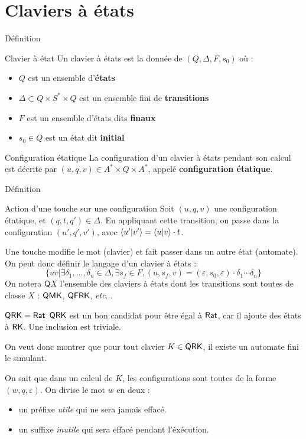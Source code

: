 \documentclass[11pt,french,professionalfonts]{beamer}
\begin{document}
\section{Claviers à états}
\begin{frame}{Définition}
	\begin{block}{Clavier à état}
		Un clavier à états est la donnée de $(Q,\Delta ,F,s_0)$ où :
        \begin{itemize}
            \item $Q$ est un ensemble d'\textbf{états}
            \item $\Delta \subset Q \times S^* \times Q$ est un ensemble fini de \textbf{transitions}
            \item $F$ est un ensemble d'états dits \textbf{finaux}
            \item $s_0 \in Q$ est un état dit \textbf{initial}
        \end{itemize}
	\end{block}
	\pause
	\begin{block}{Configuration étatique}
		La configuration d'un clavier à états pendant son calcul est décrite par $(u,q,v) \in A^* \times Q \times A^*$, appelé \textbf{configuration étatique}.
	\end{block}
\end{frame}
\begin{frame}{Définition}
	\begin{exampleblock}{Action d'une touche sur une configuration}	
		Soit $(u,q,v)$ une configuration étatique, et $(q,t,q') \in \Delta$. En appliquant cette transition, on passe dans la configuration $(u',q',v')$, avec $\left\langle u' \middle| v' \right\rangle = \left\langle u \middle| v \right\rangle \cdot t$.
	\end{exampleblock}
	Une touche modifie le mot (clavier) et fait passer dans un autre état (automate).
	\pause
    On peut donc définir le langage d'un clavier à états :
    \[ \{uv | \exists\delta_1,...,\delta_n \in \Delta, \exists s_f \in F, (u,s_f,v) = (\varepsilon,s_0,\varepsilon)\cdot\delta_1\cdots\delta_n \}\]
	\pause
    On notera $\mathsf{Q}X$ l'ensemble des claviers à états dont les transitions sont toutes de classe $X$ : $\mathsf{QMK}$, $\mathsf{QFRK}$, \textit{etc}... 
\end{frame}
\begin{frame}{$\mathsf{QRK} = \mathsf{Rat}$}
	$\mathsf{QRK}$ est un bon candidat pour être égal à $\mathsf{Rat}$, car il ajoute des états à $\mathsf{RK}$.
	Une inclusion est triviale.
	\pause

	On veut donc montrer que pour tout clavier $K \in \mathsf{QRK}$, il existe un automate fini le simulant.
	\pause

	On sait que dans un calcul de $K$, les configurations sont toutes de la forme $(w,q,\varepsilon)$. On divise le mot $w$ en deux :
	\begin{itemize}
		\item un préfixe \emph{utile} qui ne sera jamais effacé.
		\item un suffixe \emph{inutile} qui sera effacé pendant l'éxécution.
	\end{itemize}
\end{frame}
\end{document}
